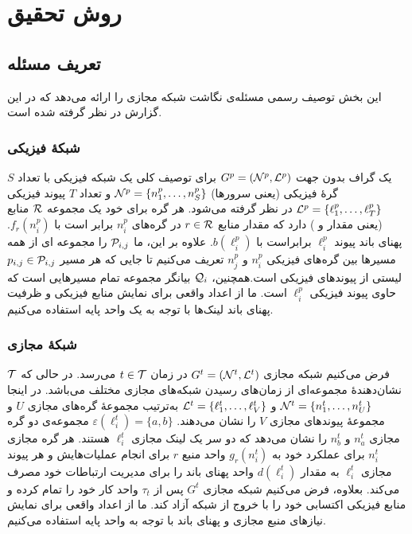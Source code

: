\chapter{روش تحقیق}

\section{تعریف مسئله}
\label{section_problem}
این بخش توصیف رسمی مسئله‌ی نگاشت شبکه مجازی را ارائه می‌دهد که در این گزارش در نظر گرفته شده است.

\subsection{شبکه‌ٔ فیزیکی}
یک گراف بدون جهت 
$G^{p}=(\mathcal{N}^{p}, \mathcal{L}^{p})$
برای توصیف کلی یک شبکه فیزیکی با تعداد $S$ گره‌ٔ فیزیکی (یعنی سرور‌ها)  $\mathcal{N}^{p}=\{n_{1}^{p},\dots,n_{S}^{p} \}$  و تعداد $T$ پیوند فیزیکی $\mathcal{L}^{p}=\{ \ell_{1}^{p}, \dots, \ell_{T}^{p} \}$ در نظر گرفته می‌شود.
هر گره برای خود یک مجموعه $\mathcal{R}$ منابع (یعنی مقدار  و ) دارد که مقدار منابع $r\in\mathcal{R}$  در گره‌های $n_{i}^{p}$ برابر است با $f_{r}(n_{i}^{p})$.  پهنای باند پیوند $\ell_{i}^{p}$ برابراست با $b(\ell_{i}^{p})$. 
علاوه بر این، ما $\mathcal{P}_{i,j}$ را مجموعه ای از همه مسیرها بین گره‌های فیزیکی $n_{i}^{p}$ و $n_{j}^{p}$ تعریف می‌کنیم تا  جایی که هر مسیر $p_{i,j}\in\mathcal{P}_{i,j}$ لیستی از پیوندهای فیزیکی است.همچنین،  $\mathcal{Q}_{i}$ بیانگر مجموعه تمام مسیرهایی است که حاوی پیوند فیزیکی $\ell_{i}^{p}$ است. ما از اعداد واقعی برای نمایش منابع فیزیکی و ظرفیت‌ پهنای باند لینک‌ها با توجه به یک واحد پایه استفاده می‌کنیم.

\subsection{شبکهٔ مجازی}
فرض می‌کنیم شبکه مجازی 
$G^{t}=(\mathcal{N}^{t}, \mathcal{L}^{t})$
در زمان 
$t\in\mathcal{T}$
می‌رسد. در حالی که 
$\mathcal{T}$ 
نشان‌دهنده‌ٔ مجموعه‌ای از زمان‌های رسیدن شبکه‌های مجازی مختلف می‌باشد. در اینجا $\mathcal{N}^{t}=\{ n_{1}^{t},\dots,n_{U}^{t} \}$ و  $\mathcal{L}^{t}=\{ \ell_{1}^{t}, \dots, \ell_{V}^{t} \}$ به‌ترتیب مجموعه‌ٔ گره‌های مجازی $U$ و مجموعه‌ٔ پیوند‌های مجازی $V$ را نشان می‌دهند. 
$\varepsilon(\ell_{i}^{t})=\{a,b\}$
مجموعه‌ی دو گره‌ مجازی $n_{a}^{t}$ و  $n_{b}^{t}$ را نشان می‌دهد که دو سر یک لینک مجازی $\ell_{i}^{t}$ هستند.
هر گره مجازی $n_{i}^{t}$ برای عملکرد خود به $g_{r}(n_{i}^{t})$ واحد منبع $r$ برای انجام عملیات‌هایش و هر پیوند مجازی $\ell_{i}^{t}$ به مقدار $d(\ell_{i}^{t})$ واحد پهنای باند را برای مدیریت ارتباطات خود مصرف می‌کند. بعلاوه، فرض می‌کنیم شبکه مجازی $G^{t}$ پس از $\tau_{t}$ واحد کار خود را تمام کرده و منابع فیزیکی اکتسابی خود را با خروج از شبکه آزاد کند. ما از اعداد واقعی برای نمایش نیازهای منبع مجازی و پهنای باند با توجه به واحد پایه استفاده می‌کنیم.
